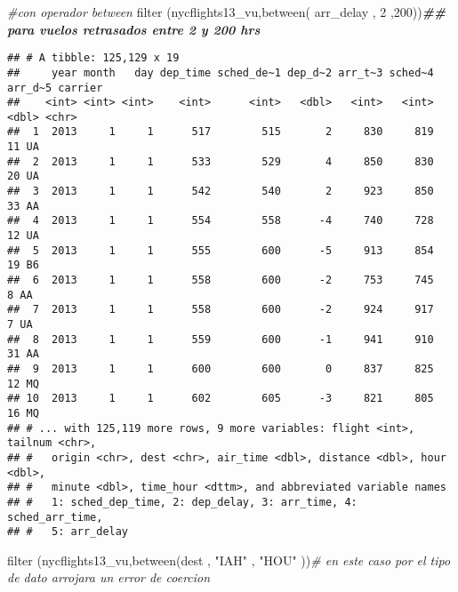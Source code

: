 \documentclass[
]{article}
\newenvironment{Shaded}{\begin{snugshade}}{\end{snugshade}}
\newcommand{\CommentTok}[1]{\textcolor[rgb]{0.56,0.35,0.01}{\textit{#1}}}
\newcommand{\DocumentationTok}[1]{\textcolor[rgb]{0.56,0.35,0.01}{\textbf{\textit{#1}}}}
\newcommand{\FunctionTok}[1]{\textcolor[rgb]{0.00,0.00,0.00}{#1}}
\newcommand{\NormalTok}[1]{#1}
\newcommand{\StringTok}[1]{\textcolor[rgb]{0.31,0.60,0.02}{#1}}
\begin{document}
\begin{Shaded}
\begin{Highlighting}[]
\CommentTok{\#con operador between}
\FunctionTok{filter}\NormalTok{ (nycflights13\_vu,}\FunctionTok{between}\NormalTok{( arr\_delay , }\StringTok{\textquotesingle{}2\textquotesingle{}}\NormalTok{ ,}\StringTok{\textquotesingle{}200\textquotesingle{}}\NormalTok{))}\DocumentationTok{\#\# para vuelos retrasados entre 2 y 200 hrs}
\end{Highlighting}
\end{Shaded}

\begin{verbatim}
## # A tibble: 125,129 x 19
##     year month   day dep_time sched_de~1 dep_d~2 arr_t~3 sched~4 arr_d~5 carrier
##    <int> <int> <int>    <int>      <int>   <dbl>   <int>   <int>   <dbl> <chr>  
##  1  2013     1     1      517        515       2     830     819      11 UA     
##  2  2013     1     1      533        529       4     850     830      20 UA     
##  3  2013     1     1      542        540       2     923     850      33 AA     
##  4  2013     1     1      554        558      -4     740     728      12 UA     
##  5  2013     1     1      555        600      -5     913     854      19 B6     
##  6  2013     1     1      558        600      -2     753     745       8 AA     
##  7  2013     1     1      558        600      -2     924     917       7 UA     
##  8  2013     1     1      559        600      -1     941     910      31 AA     
##  9  2013     1     1      600        600       0     837     825      12 MQ     
## 10  2013     1     1      602        605      -3     821     805      16 MQ     
## # ... with 125,119 more rows, 9 more variables: flight <int>, tailnum <chr>,
## #   origin <chr>, dest <chr>, air_time <dbl>, distance <dbl>, hour <dbl>,
## #   minute <dbl>, time_hour <dttm>, and abbreviated variable names
## #   1: sched_dep_time, 2: dep_delay, 3: arr_time, 4: sched_arr_time,
## #   5: arr_delay
\end{verbatim}

\begin{Shaded}
\begin{Highlighting}[]
\FunctionTok{filter}\NormalTok{ (nycflights13\_vu,}\FunctionTok{between}\NormalTok{(dest , }\StringTok{"IAH"}\NormalTok{ , }\StringTok{"HOU"}\NormalTok{ ))}\CommentTok{\# en este caso por el tipo de dato arrojara un error de coercion}
\end{Highlighting}
\end{Shaded}
\end{document}
